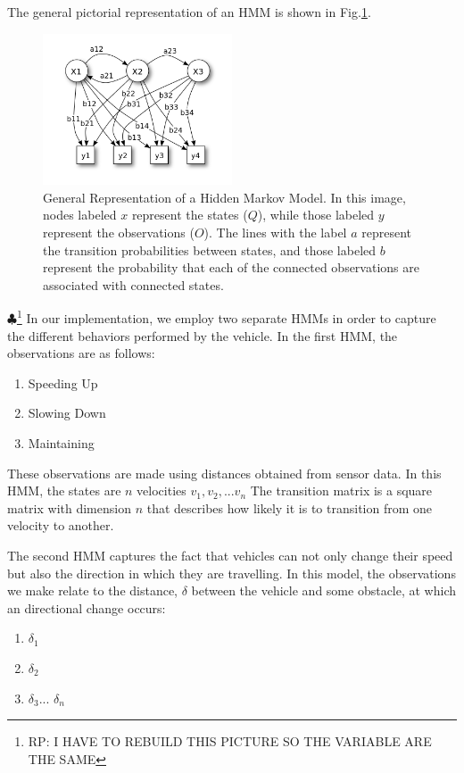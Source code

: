\documentclass[conference]{IEEEtran}
\newcommand\RP[1]{$\clubsuit$\footnote{RP: #1}}
\begin{document}
The general pictorial representation of an HMM is shown in Fig.\ref{fig:hmm}.
\begin{figure}[ht]
    \includegraphics[width=0.5\textwidth]{hmmwiki.png}
    \caption{General Representation of a Hidden Markov Model. In this image, nodes labeled $x$ represent the states ($Q$), while those labeled $y$ represent the observations ($O$). The lines with the label $a$ represent the transition probabilities between states, and those labeled $b$ represent the probability that each of the connected observations are associated with connected states.}
    \label{fig:hmm}
\end{figure}
\RP{I HAVE TO REBUILD THIS PICTURE SO THE VARIABLE ARE THE SAME}
In our implementation, we employ two separate HMMs in order to capture the different behaviors performed by the vehicle. In the first HMM, the observations are as follows:
\begin{enumerate}
    \item Speeding Up
    \item Slowing Down
    \item Maintaining
\end{enumerate}

These observations are made using distances obtained from sensor data. In this HMM, the states are $n$ velocities $v_1,v_2,...v_{n}$ The transition matrix is a square matrix with dimension $n$ that describes how likely it is to transition from one velocity to another.

The second HMM captures the fact that vehicles can not only change their speed but also the direction in which they are travelling. In this model, the observations we make relate to the distance, $\delta$ between the vehicle and some obstacle, at which an directional change occurs:
\begin{enumerate}
    \item $\delta_1$
    \item $\delta_2$
    \item $\delta_3$... $\delta_n$
\end{enumerate}
\end{document}
